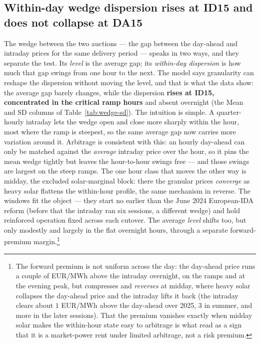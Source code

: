 \documentclass[11pt,a4paper]{article}
\theoremstyle{definition}
\theoremstyle{remark}
\theoremstyle{plain}
\begin{document}
\subsection{Within-day wedge dispersion rises at ID15 and does not collapse at DA15}\label{sec:results:6-5wedge}\label{sec:results:Q3}\label{sec:results:6-6}\label{sec:results:6-6b}\label{tab:bsts-buy-share}

The wedge between the two auctions --- the gap between the day-ahead and intraday prices for the same delivery period --- speaks in two ways, and they separate the test. Its \emph{level} is the average gap; its \emph{within-day dispersion} is how much that gap swings from one hour to the next. The model says granularity can reshape the dispersion without moving the level, and that is what the data show: the average gap barely changes, while the dispersion \textbf{rises at ID15, concentrated in the critical ramp hours} and absent overnight (the Mean and SD columns of Table~\ref{tab:wedge-sd}). The intuition is simple. A quarter-hourly intraday lets the wedge open and close more sharply within the hour, most where the ramp is steepest, so the same average gap now carries more variation around it. Arbitrage is consistent with this: an hourly day-ahead can only be matched against the \emph{average} intraday price over the hour, so it pins the mean wedge tightly but leaves the hour-to-hour swings free --- and those swings are largest on the steep ramps. The one hour class that moves the other way is midday, the excluded solar-marginal block: there the granular prices \emph{converge} as heavy solar flattens the within-hour profile, the same mechanism in reverse. The windows fit the object --- they start no earlier than the June 2024 European-IDA reform (before that the intraday ran six sessions, a different wedge) and hold reinforced operation fixed across each cutover. The average \emph{level} shifts too, but only modestly and largely in the flat overnight hours, through a separate forward-premium margin.\footnote{The forward premium is not uniform across the day: the day-ahead price runs a couple of EUR/MWh above the intraday overnight, on the ramps and at the evening peak, but compresses and \emph{reverses} at midday, where heavy solar collapses the day-ahead price and the intraday lifts it back (the intraday clears about $1$ EUR/MWh above the day-ahead over 2025, $3$ in summer, and more in the later sessions). That the premium vanishes exactly when midday solar makes the within-hour state easy to arbitrage is what \citet{ito_reguant_2016} read as a sign that it is a market-power rent under limited arbitrage, not a risk premium.}
\end{document}
